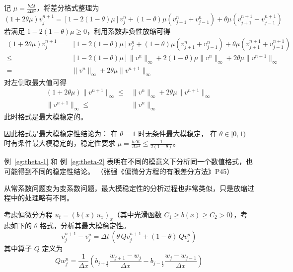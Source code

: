 \begin{solution*}
    记 $\mu = \frac{b \Delta t}{\Delta x^2}$，将差分格式整理为
    \[
        (1 + 2 \theta \mu) v_j^{n+1}
        = \left[1-2(1-\theta) \mu \right] v_j^n + (1-\theta) \mu (v_{j+1}^{n} + v_{j-1}^{n}) + \theta \mu (v_{j+1}^{n+1} + v_{j-1}^{n+1})
    \]
    若满足 $1-2(1-\theta) \mu \ge 0$，利用系数非负性放缩可得
    \begin{align*}
        (1 + 2 \theta \mu) v_j^{n+1}
        ={}   & \left[1-2(1-\theta) \mu \right] v_j^n + (1-\theta) \mu (v_{j+1}^{n} + v_{j-1}^{n}) + \theta \mu (v_{j+1}^{n+1} + v_{j-1}^{n+1}) \\
        \le{} & \left[1-2(1-\theta) \mu \right] \|v^n \|_{\infty} + 2 (1-\theta) \mu \|v^n \|_{\infty}
        + 2 \theta \mu \|v^{n+1}\|_{\infty}                                                                                                     \\
        ={}   & \|v^n\|_{\infty} + 2 \theta \mu \|v^{n+1}\|_{\infty}
    \end{align*}
    对左侧取最大值可得
    \begin{align*}
        (1 + 2 \theta \mu)\|v^{n+1}\|_{\infty} \le{} & \|v^n\|_{\infty} + 2 \theta \mu \|v^{n+1}\|_{\infty} \\
        \|v^{n+1}\|_{\infty} \le{}                   & \|v^n\|_{\infty}
    \end{align*}
    此时格式是最大模稳定的。

    因此格式是最大模稳定性结论为：
    在 $\theta=1$ 时无条件最大模稳定，
    在 $\theta \in [0,1)$ 时有条件最大模稳定的，稳定性要求 $\mu = \frac{b \Delta t}{\Delta x^2} \le \frac{1}{2(1-\theta)}$。
\end{solution*}

\begin{remark}
    例~\ref{eg:theta-1} 和 例~\ref{eg:theta-2} 表明在不同的模意义下分析同一个数值格式，也可能得到不同的稳定性结论。
    （张强《偏微分方程的有限差分方法》P45）
\end{remark}

从常系数问题变为变系数问题，最大模稳定性的分析过程也非常类似，只是放缩过程中的处理略有不同。

\begin{example}
    考虑偏微分方程 $u_t=(b(x)\, u_x)_x$（其中光滑函数 $C_1 \ge b(x) \ge C_2 > 0$），考虑如下的 $\theta$ 格式，分析其最大模稳定性。
    \[
        v^{n+1}_j - v^n_j = \Delta t\,(\theta\,Q v^{n+1}_j+(1-\theta)\, Q v^n_j)
    \]
    其中算子 $Q$ 定义为
    \[
        Q w^n_j=\frac{1}{\Delta x}\left(b_{j+\frac12}\frac{w_{j+1}-w_{j}}{\Delta x} - b_{j-\frac12}\frac{w_j-w_{j-1}}{\Delta x}\right)
    \]
\end{example}


